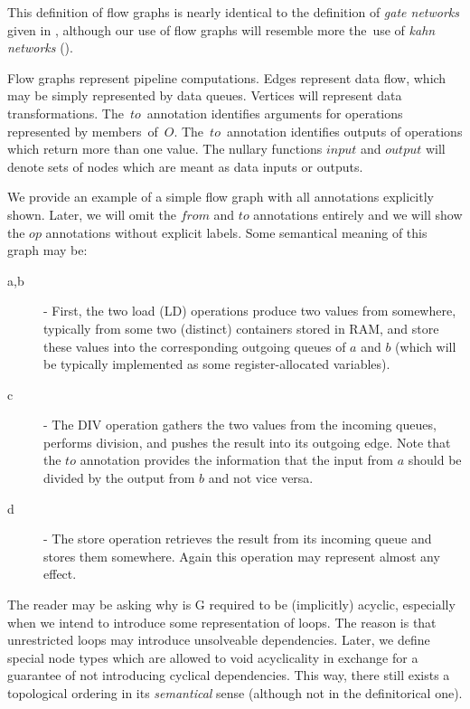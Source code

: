   This definition of flow graphs is nearly identical to the definition of \emph{gate networks} given in \cite{ads}, although our use of flow graphs will resemble more the~use of \emph{kahn networks} (\cite{asdfe}). 

  Flow graphs represent pipeline computations. Edges represent data flow, which may be simply represented by data queues. Vertices will represent data transformations. The~$to$~annotation identifies arguments for operations represented by members~of~$O$. The~$to$~annotation identifies outputs of operations which return more than one value. The nullary functions $input$ and $output$ will denote sets of nodes which are meant as data inputs or outputs.


  We provide an example of a simple flow graph with all annotations explicitly shown. Later, we will omit the $from$ and $to$ annotations entirely and we will show the $op$ annotations without explicit labels. Some semantical meaning of this graph may be:

  \begin{description}
  \item[a,b] - First, the two load (LD) operations produce two values from somewhere, typically from some two (distinct) containers stored in RAM, and store these values into the corresponding outgoing queues of $a$ and $b$ (which will be typically implemented as some register-allocated variables). 
  \item[c] - The DIV operation gathers the two values from the incoming queues, performs division, and pushes the result into its outgoing edge. Note that the $to$ annotation provides the information that the input from $a$ should be divided by the output from $b$ and not vice versa.
  \item[d] - The store operation retrieves the result from its incoming queue and stores them somewhere. Again this operation may represent almost any effect.
  \end{description}

\begin{rem}
  The reader may be asking why is G required to be (implicitly) acyclic, especially when we intend to introduce some representation of loops. The reason is that unrestricted loops may introduce unsolveable dependencies. Later, we define special node types which are allowed to void acyclicality in exchange for a guarantee of not introducing cyclical dependencies. This way, there still exists a topological ordering in its \emph{semantical} sense (although not in the definitorical one). 
\end{rem}

